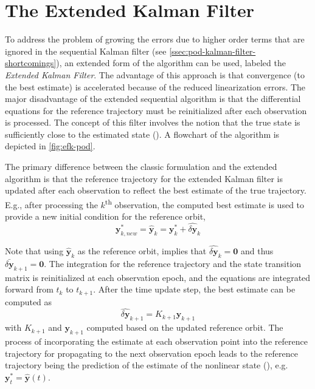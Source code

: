 \section{The Extended Kalman Filter}\label{sec:pod-extended-kalman-filter}

To address the problem of growing the errors due to higher order terms that are 
ignored in the sequential Kalman filter (see \autoref{ssec:pod-kalman-filter-shortcomings}), 
an extended form of the algorithm can be used, labeled the \emph{Extended Kalman Filter}.
The advantage of this approach is that convergence (to the best estimate) is 
accelerated because of the reduced linearization errors. The major disadvantage 
of the extended sequential algorithm is that the differential equations for the 
reference trajectory must be reinitialized after each observation is processed.
The concept of this filter involves the notion that the true state is sufficiently 
close to the estimated state (\cite{Markley2019}).
A flowchart of the algorithm is depicted in \autoref{fig:efk-pod}.

The primary difference between the classic formulation and the extended algorithm
is that the reference trajectory for the extended Kalman filter is updated 
after each observation to reflect the best estimate of the true trajectory. E.g., 
after processing the $k$\textsuperscript{th} observation, the computed best estimate 
is used to provide a new initial condition for the reference orbit,
\begin{equation}\label{eq:tapley4728}
    \bm{y}^{*}_{k, new} = \hat{\bm{y}}_k = \bm{y}^{*}_k + \hat{\delta \bm{y}}_k
\end{equation}

Note that using $\hat{\bm{y}}_k$ as the reference orbit, implies that $\hat{\delta \bm{y}}_k=\bm{0}$ 
and thus $\bar{\delta \bm{y}}_{k+1}=\bm{0}$. The integration for the reference 
trajectory and the state transition matrix is reinitialized at each observation 
epoch, and the equations are integrated forward from $t_k$ to $t_{k+1}$. After 
the time update step, the best estimate can be computed as 
\begin{equation}
    \hat{\delta \bm{y}}_{k+1} = K_{k+1} \bm{y}_{k+1}
\end{equation}
with $K_{k+1}$ and $\bm{y}_{k+1}$ computed based on the updated reference orbit.
The process of incorporating the estimate at each observation point into the 
reference trajectory for propagating to the next observation epoch leads to
the reference trajectory being the prediction of the estimate of the nonlinear state 
(\cite{Tapley2004}), e.g. $\bm{y}^{*}_{t} = \hat{\bm{y}}(t)$.

